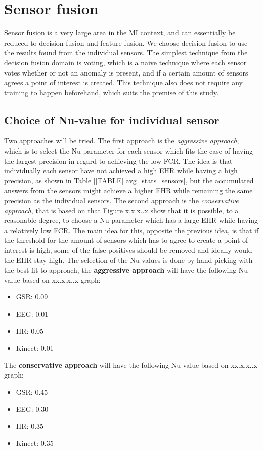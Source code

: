 \section{Sensor fusion}
Sensor fusion is a very large area in the MI context, and can essentially be reduced to decision fusion and feature fusion. 
We choose decision fusion to use the results found from the individual sensors.
The simplest technique from the decision fusion domain is voting, which is a naive technique where each sensor votes whether or not an anomaly is present, and if a certain amount of sensors agrees a point of interest is created. This technique also does not require any training to happen beforehand, which suits the premise of this study.

\subsection{Choice of Nu-value for individual sensor}
Two approaches will be tried. The first approach is the \textit{aggressive approach}, which is to select the Nu parameter for each sensor which fits the case of having the largest precision in regard to achieving the low FCR. The idea is that individually each sensor have not achieved a high EHR while having a high precision, as shown in Table \ref{[TABLE] avg_stats_sensors}, but the accumulated answers from the sensors might achieve a higher EHR while remaining the same precision as the individual sensors.
The second approach is the \textit{conservative approach}, that is based on that Figure x.x.x..x show that it is possible, to a reasonable degree, to choose a Nu parameter which has a large EHR while having a relatively low FCR. The main idea for this, opposite the previous idea, is that if the threshold for the amount of sensors which has to agree to create a point of interest is high, some of the false positives should be removed and ideally would the EHR stay high.
The selection of the Nu values is done by hand-picking with the best fit to approach, the \textbf{aggressive approach} will have the following Nu value based on xx.x.x..x graph:
\begin{itemize}
\item GSR: 0.09
\item EEG: 0.01
\item HR: 0.05
\item Kinect: 0.01
\end{itemize}
The \textbf{conservative approach} will have the following Nu value based on xx.x.x..x graph:
\begin{itemize}
\item GSR: 0.45
\item EEG: 0.30
\item HR: 0.35
\item Kinect: 0.35
\end{itemize}

